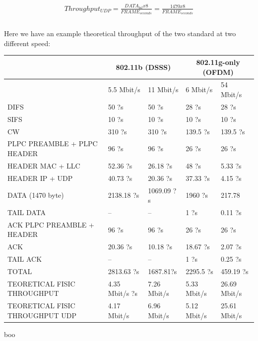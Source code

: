 	\begin{gather*}
		Throughput_{UDP} = \frac{ DATA_{bit} x 8 }{ FRAME_{seconds} } = \frac{ 1470 x 8 }{  FRAME_{seconds} } \\\\
	\end{gather*}
	
	Here we have an example theoretical throughput of the two standard at two different speed:
	
	\begin{table}[h!]
		\begin{tabularx}{15cm}{ | X | X | X | X | X | }
			\hline
				 & \multicolumn{2}{|c|}{ 802.11b (DSSS)} & \multicolumn{2}{|c|}{ 802.11g-only (OFDM)} \\
				 \hline
				 & 5.5 Mbit/s & 11 Mbit/s & 6 Mbit/s & 54 Mbit/s \\
			\hline
				DIFS & 50 ?s & 50 ?s & 28 ?s & 28 ?s \\
			\hline
				SIFS & 10 ?s & 10 ?s & 10 ?s & 10 ?s \\
			\hline
				CW & 310 ?s & 310 ?s & 139.5 ?s & 139.5 ?s \\
			\hline
				PLPC PREAMBLE + PLPC HEADER & 96 ?s & 96 ?s & 26 ?s & 26 ?s \\
			\hline
				HEADER MAC + LLC & 52.36 ?s & 26.18 ?s & 48 ?s & 5.33 ?s \\
			\hline
				HEADER IP + UDP & 40.73 ?s & 20.36 ?s & 37.33 ?s & 4.15 ?s \\
			\hline
				DATA (1470 byte)& 2138.18 ?s & 1069.09 ?s & 1960 ?s & 217.78 \\
			\hline
				TAIL DATA & -- & -- & 1 ?s & 0.11 ?s \\
			\hline
				ACK PLPC PREAMBLE + HEADER & 96 ?s & 96 ?s & 26 ?s & 26 ?s \\
			\hline
				ACK & 20.36 ?s & 10.18 ?s & 18.67 ?s & 2.07 ?s \\
			\hline
				TAIL ACK & -- & -- & 1 ?s & 0.25 ?s \\
			\hline
			\hline
				TOTAL & 2813.63 ?s & 1687.81?s & 2295.5 ?s & 459.19 ?s \\
			\hline
			\hline
				TEORETICAL FISIC THROUGHPUT & 4.35 Mbit/s ?s & 7.26 Mbit/s & 5.33 Mbit/s & 26.69 Mbit/s \\
			\hline
			\hline
				TEORETICAL FISIC THROUGHPUT UDP & 4.17 Mbit/s & 6.96 Mbit/s & 5.12 Mbit/s & 25.61 Mbit/s \\
			\hline
			
		\end{tabularx}
	\end{table}
	
	boo
	

	








